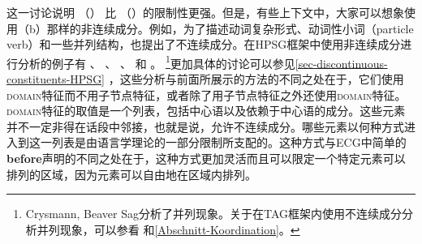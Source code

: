 这一讨论说明 （） 比 （）的限制性更强。但是，有些上下文中，大家可以想象使用（b）那样的非连续成分。例如，为了描述动词复杂形式、动词性小词（particle verb）和一些并列结构，也提出了不连续成分\citep{Wells47a}。在HPSG\indexhpsgc 框架中使用非连续成分进行分析的例子有 、 、 、 和 。 \footnote{%
Crysmann, Beaver \biband Sag分析了并列现象。关于在TAG\indextagc 框架内使用不连续成分分析并列现象，可以参看 和\ref{Abschnitt-Koordination}。%
	}更加具体的讨论可以参见\ref{sec-discontinuous-constituents-HPSG} ，这些分析与前面所展示的方法的不同之处在于，它们使用\textsc{domain}特征而不用子节点特征，或者除了用子节点特征之外还使用\textsc{domain}特征。\textsc{domain}特征的取值是一个列表，包括中心语以及依赖于中心语的成分。这些元素并不一定非得在话段中邻接，也就是说，允许不连续成分。哪些元素以何种方式进入到这一列表是由语言学理论的一部分限制所支配的。这种方式与ECG中简单的\textbf{before}声明的不同之处在于，这种方式更加灵活而且可以限定一个特定元素可以排列的区域，因为元素可以自由地在区域内排列。

